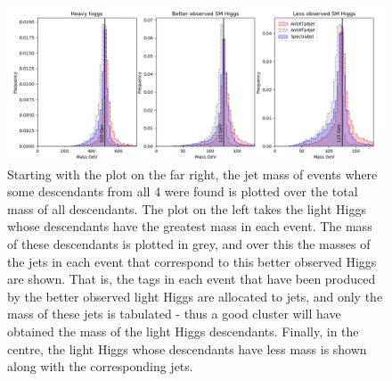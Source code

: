 \begin{figure}[htp]
    \includegraphics[width=1.\textwidth]{graphics/mass_peaks/heavy_long_correct_frequency.png}
    \caption{Starting with the plot on the far right, the jet mass of events where
        some descendants from all 4  were found is plotted over
        the total mass of all descendants.
        The plot on the left takes the light Higgs whose descendants have the greatest mass in each event.
        The mass of these descendants is plotted in grey, and over this
        the masses of the jets in each event that correspond to this better observed Higgs
        are shown.
        That is, the tags in each event that have been produced by the better observed light Higgs
        are allocated to jets, and only the mass of these jets is tabulated - thus
        a good cluster will have obtained the mass of the light Higgs descendants.
        Finally, in the centre, the light Higgs whose descendants have less mass is shown along with
        the corresponding jets.
    }
\end{figure}    


